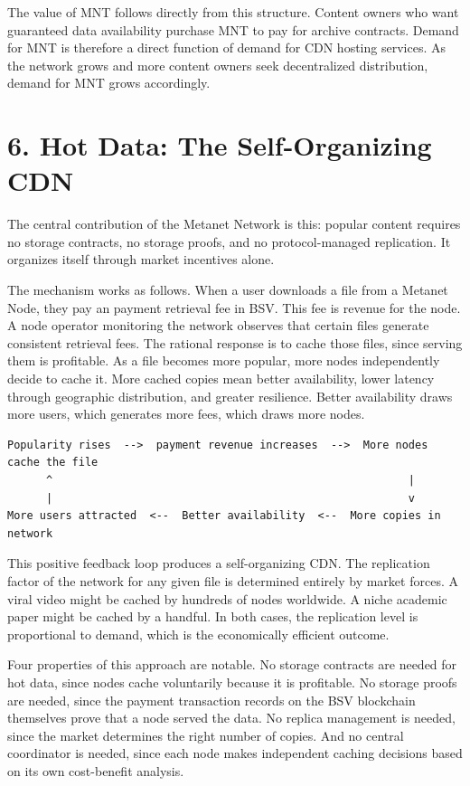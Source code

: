 \documentclass[11pt,a4paper]{article}
\begin{document}
The value of MNT follows directly from this structure. Content owners who want guaranteed data availability purchase MNT to pay for archive contracts. Demand for MNT is therefore a direct function of demand for CDN hosting services. As the network grows and more content owners seek decentralized distribution, demand for MNT grows accordingly.

\section{6. Hot Data: The Self-Organizing CDN}

The central contribution of the Metanet Network is this: popular content requires no storage contracts, no storage proofs, and no protocol-managed replication. It organizes itself through market incentives alone.

The mechanism works as follows. When a user downloads a file from a Metanet Node, they pay an payment retrieval fee in BSV. This fee is revenue for the node. A node operator monitoring the network observes that certain files generate consistent retrieval fees. The rational response is to cache those files, since serving them is profitable. As a file becomes more popular, more nodes independently decide to cache it. More cached copies mean better availability, lower latency through geographic distribution, and greater resilience. Better availability draws more users, which generates more fees, which draws more nodes.

\begin{lstlisting}
Popularity rises  -->  payment revenue increases  -->  More nodes cache the file
      ^                                                       |
      |                                                       v
More users attracted  <--  Better availability  <--  More copies in network
\end{lstlisting}

This positive feedback loop produces a self-organizing CDN. The replication factor of the network for any given file is determined entirely by market forces. A viral video might be cached by hundreds of nodes worldwide. A niche academic paper might be cached by a handful. In both cases, the replication level is proportional to demand, which is the economically efficient outcome.

Four properties of this approach are notable. No storage contracts are needed for hot data, since nodes cache voluntarily because it is profitable. No storage proofs are needed, since the payment transaction records on the BSV blockchain themselves prove that a node served the data. No replica management is needed, since the market determines the right number of copies. And no central coordinator is needed, since each node makes independent caching decisions based on its own cost-benefit analysis.
\end{document}
